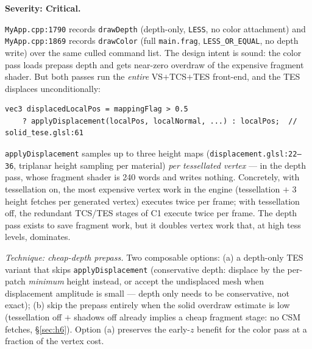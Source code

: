 \documentclass[11pt,a4paper]{article}
\begin{document}
\textbf{Severity: Critical.}

\texttt{MyApp.cpp:1790} records \texttt{drawDepth} (depth-only,
\texttt{LESS}, no color attachment) and \texttt{MyApp.cpp:1869} records
\texttt{drawColor} (full \texttt{main.frag}, \texttt{LESS\_OR\_EQUAL}, no depth
write) over the same culled command list. The design intent is sound: the
color pass loads prepass depth and gets near-zero overdraw of the expensive
fragment shader. But both passes run the \emph{entire} VS$+$TCS$+$TES
front-end, and the TES displaces unconditionally:

\begin{lstlisting}[basicstyle=\footnotesize\ttfamily]
vec3 displacedLocalPos = mappingFlag > 0.5
    ? applyDisplacement(localPos, localNormal, ...) : localPos;  // solid_tese.glsl:61
\end{lstlisting}

\texttt{applyDisplacement} samples up to three height maps
(\texttt{displacement.glsl:22--36}, triplanar height sampling per material)
\emph{per tessellated vertex} --- in the depth pass, whose fragment shader is
240 words and writes nothing. Concretely, with tessellation on, the most
expensive vertex work in the engine (tessellation $+$ 3 height fetches per
generated vertex) executes twice per frame; with tessellation off, the
redundant TCS/TES stages of C1 execute twice per frame. The depth pass exists
to save fragment work, but it doubles vertex work that, at high tess levels,
dominates.

\textit{Technique: cheap-depth prepass.} Two composable options: (a) a
depth-only TES variant that skips \texttt{applyDisplacement} (conservative
depth: displace by the per-patch \emph{minimum} height instead, or accept the
undisplaced mesh when displacement amplitude is small --- depth only needs to
be conservative, not exact); (b) skip the prepass entirely when the solid
overdraw estimate is low (tessellation off $+$ shadows off already implies a
cheap fragment stage: no CSM fetches, \S\ref{sec:h6}). Option (a) preserves the
early-$z$ benefit for the color pass at a fraction of the vertex cost.
\end{document}
